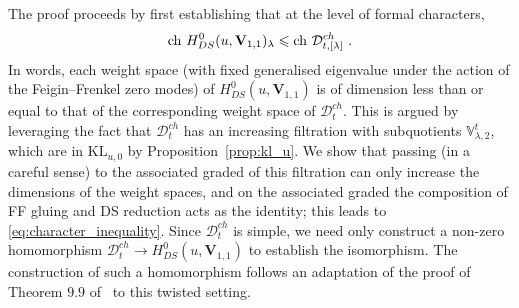 \documentclass[a4paper]{article}
\def\IV{\mathbb{V}}
\def\ch{{\rm ch}}
\def \KL{\mathrm{KL}}
\def\D{\mathcal{D}^{ch}}
\def\V{\mathbf{V}}
\begin{document}
The proof proceeds by first establishing that at the level of formal characters,
\begin{equation}\label{eq:character_inequality}
\ch~ H^0_{DS}(u,\V_{1,1})_{\lambda} \leqslant \ch~ \D_{t,[\lambda]}~.
\end{equation}
In words, each weight space (with fixed generalised eigenvalue under the action of the Feigin--Frenkel zero modes) of $H^0_{DS}(u,\V_{1,1})$ is of dimension less than or equal to that of the corresponding weight space of $\D_t$. This is argued by leveraging the fact that $\D_t$ has an increasing filtration with subquotients $\IV^t_{\lambda,2}$, which are in $\KL_{u,0}$ by Proposition~\ref{prop:kl_u}. We show that passing (in a careful sense) to the associated graded of this filtration can only increase the dimensions of the weight spaces, and on the associated graded the composition of FF gluing and DS reduction acts as the identity; this leads to \eqref{eq:character_inequality}. Since $\D_t$ is simple, we need only construct a non-zero homomorphism $\D_t\rightarrow H^0_{DS}(u,\V_{1,1})$ to establish the isomorphism. The construction of such a homomorphism follows an adaptation of the proof of Theorem $9.9$ of~\cite{Arakawa:2018egx} to this twisted setting.
\end{document}
